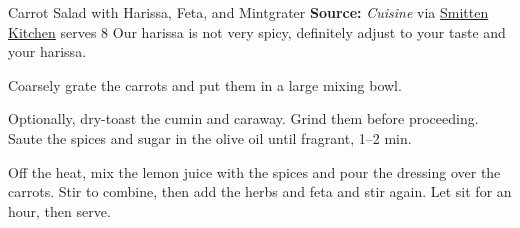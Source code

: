 \begin{recipe}{Carrot Salad with Harissa, Feta, and Mint}{grater \hfill} %
 {\textbf{Source:} \textit{Cuisine} via \href{https://smittenkitchen.com/2010/05/carrot-salad-with-harissa-feta-and-mint/}{Smitten Kitchen} \hfill serves 8}
 \freeform Our harissa is not very spicy, definitely adjust to your taste and your harissa.

 Coarsely grate the carrots and put them in a large mixing bowl.

 Optionally, dry-toast the cumin and caraway. Grind them before proceeding. Saute the spices and sugar in the olive oil until fragrant, 1--2 min.

 Off the heat, mix the lemon juice with the spices and pour the dressing over the carrots. Stir to combine, then add the herbs and feta and stir again. Let sit for an hour, then serve.
\end{recipe}
